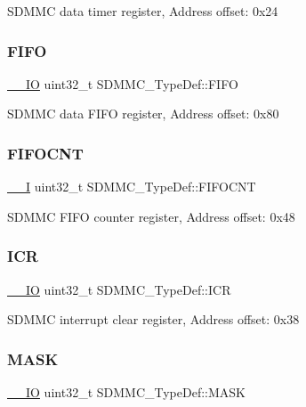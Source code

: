 S\+D\+M\+MC data timer register, Address offset\+: 0x24 \mbox{\label{struct_s_d_m_m_c___type_def_abf434e9dc8f9269c8bc0e703d0999f35}} 
\subsubsection{\texorpdfstring{FIFO}{FIFO}}
{\footnotesize\ttfamily \mbox{\hyperlink{core__sc300_8h_aec43007d9998a0a0e01faede4133d6be}{\+\_\+\+\_\+\+IO}} uint32\+\_\+t S\+D\+M\+M\+C\+\_\+\+Type\+Def\+::\+F\+I\+FO}

S\+D\+M\+MC data F\+I\+FO register, Address offset\+: 0x80 \mbox{\label{struct_s_d_m_m_c___type_def_a2a18f6abcd9b7fb698d77f02ecca5b82}} 
\subsubsection{\texorpdfstring{FIFOCNT}{FIFOCNT}}
{\footnotesize\ttfamily \mbox{\hyperlink{core__sc300_8h_af63697ed9952cc71e1225efe205f6cd3}{\+\_\+\+\_\+I}} uint32\+\_\+t S\+D\+M\+M\+C\+\_\+\+Type\+Def\+::\+F\+I\+F\+O\+C\+NT}

S\+D\+M\+MC F\+I\+FO counter register, Address offset\+: 0x48 \mbox{\label{struct_s_d_m_m_c___type_def_a99775edb5f62c67e26fa0aa00293d51c}} 
\subsubsection{\texorpdfstring{ICR}{ICR}}
{\footnotesize\ttfamily \mbox{\hyperlink{core__sc300_8h_aec43007d9998a0a0e01faede4133d6be}{\+\_\+\+\_\+\+IO}} uint32\+\_\+t S\+D\+M\+M\+C\+\_\+\+Type\+Def\+::\+I\+CR}

S\+D\+M\+MC interrupt clear register, Address offset\+: 0x38 \mbox{\label{struct_s_d_m_m_c___type_def_a8f40e43afa9cf4ecf21c0cd1b2650560}} 
\subsubsection{\texorpdfstring{MASK}{MASK}}
{\footnotesize\ttfamily \mbox{\hyperlink{core__sc300_8h_aec43007d9998a0a0e01faede4133d6be}{\+\_\+\+\_\+\+IO}} uint32\+\_\+t S\+D\+M\+M\+C\+\_\+\+Type\+Def\+::\+M\+A\+SK}

